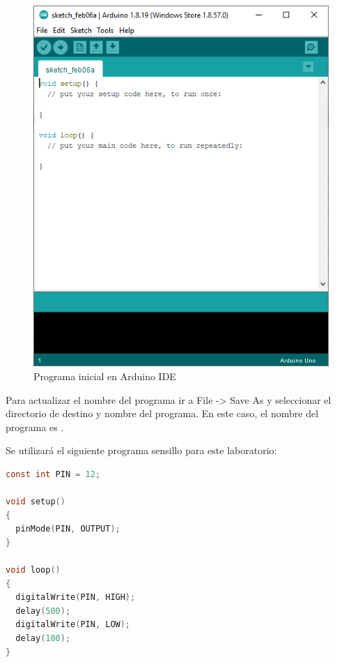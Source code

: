 \documentclass{article}
\begin{document}
\begin{figure}[H]
    \centering
    \includegraphics[width=0.5\paperwidth]{images/arduino-1.png}
    \caption{Programa inicial en Arduino IDE}
\end{figure}

Para actualizar el nombre del programa ir a File -> Save As y seleccionar el directorio de destino y nombre del programa. En este caso, el nombre del programa es .

\bigbreak

Se utilizará el siguiente programa sensillo para este laboratorio:

\begin{lstlisting}[language=C, caption=Programa para activar una salida digital]
const int PIN = 12;

void setup() 
{
  pinMode(PIN, OUTPUT);
}

void loop() 
{
  digitalWrite(PIN, HIGH);
  delay(500);
  digitalWrite(PIN, LOW);
  delay(100);
}
\end{lstlisting}
\end{document}
